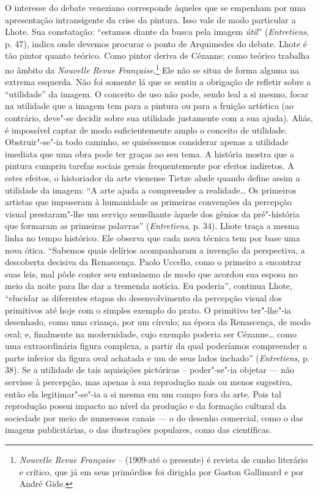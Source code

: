 O interesse do debate veneziano corresponde àqueles que se empenham por
uma apresentação intransigente da crise da pintura. Isso vale de modo
particular a Lhote. Sua constatação: ``estamos diante da busca pela
imagem \emph{útil}'' (\emph{Entretiens}, p. 47), indica onde devemos
procurar o ponto de Arquimedes do debate. Lhote é tão pintor quanto
teórico. Como pintor deriva de Cézanne; como teórico trabalha no âmbito
da \emph{Nouvelle Revue Française}.\footnote{\emph{Nouvelle Revue
  Française} --  (1909-até o presente) é revista de cunho literário e
  crítico, que já em seus primórdios foi dirigida por Gaston Gallimard e
  por André Gide. \versal{[N. E.]}} Ele não se situa de forma alguma na extrema
esquerda. Não foi somente lá que se sentiu a obrigação de refletir sobre
a ``utilidade'' da imagem. O conceito de uso não pode, sendo leal a si
mesmo, focar na utilidade que a imagem tem para a pintura ou para a
fruição artística (ao contrário, deve"-se decidir sobre sua utilidade
justamente com a sua ajuda). Aliás, é impossível captar de modo
suficientemente amplo o conceito de utilidade. Obstruir"-se"-ia todo
caminho, se quiséssemos considerar apenas a utilidade imediata que uma
obra pode ter graças ao seu tema. A história mostra que a pintura
cumpriu tarefas sociais gerais frequentemente por efeitos indiretos. A
estes efeitos, o historiador da arte vienense Tietze alude quando define
assim a utilidade da imagem: ``A arte ajuda a compreender a realidade\ldots{}
Os primeiros artistas que impuseram à humanidade as primeiras convenções
da percepção visual prestaram"-lhe um serviço semelhante àquele dos
gênios da pré"-história que formaram as primeiras palavras''
(\emph{Entretiens}, p. 34). Lhote traça a mesma linha no tempo
histórico. Ele observa que cada nova técnica tem por base uma nova
ótica. ``Sabemos quais delírios acompanharam a invenção da perspectiva,
a descoberta decisiva da Renascença. Paolo Uccello, como o primeiro a
encontrar suas leis, mal pôde conter seu entusiasmo de modo que acordou
sua esposa no meio da noite para lhe dar a tremenda notícia. Eu
poderia'', continua Lhote, ``elucidar as diferentes etapas do
desenvolvimento da percepção visual dos primitivos até hoje com o
simples exemplo do prato. O primitivo ter"-lhe"-ia desenhado, como uma
criança, por um círculo; na época da Renascença, de modo oval; e,
finalmente na modernidade, cujo exemplo poderia ser Cézanne\ldots{} como
uma extraordinária figura complexa, a partir da qual poderíamos
compreender a parte inferior da figura oval achatada e um de seus lados
inchado'' (\emph{Entretiens}, p. 38). Se a utilidade de tais aquisições
pictóricas -- poder"-se"-ia objetar --- não servisse à percepção, mas
apenas à sua reprodução mais ou menos sugestiva, então ela
legitimar"-se"-ia a si mesma em um campo fora da arte. Pois tal reprodução
possui impacto no nível da produção e da formação cultural da sociedade
por meio de numerosos canais --- o do desenho comercial, como o das
imagens publicitárias, o das ilustrações populares, como das
científicas.

